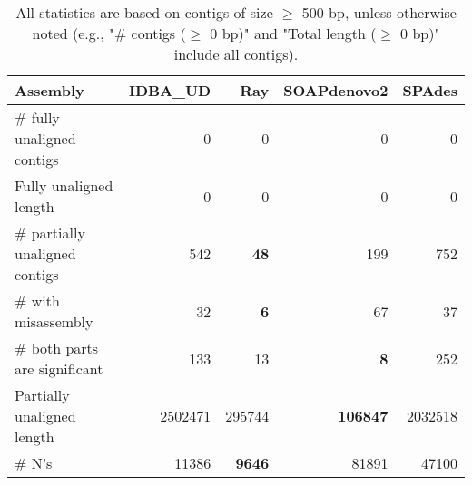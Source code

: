 \documentclass[12pt,a4paper]{article}
\begin{document}
\begin{table}[ht]
\begin{center}
\caption{All statistics are based on contigs of size $\geq$ 500 bp, unless otherwise noted (e.g., "\# contigs ($\geq$ 0 bp)" and "Total length ($\geq$ 0 bp)" include all contigs).}
\begin{tabular}{|l*{4}{|r}|}
\hline
Assembly & IDBA\_UD & Ray & SOAPdenovo2 & SPAdes \\ \hline
\# fully unaligned contigs & 0 & 0 & 0 & 0 \\ \hline
Fully unaligned length & 0 & 0 & 0 & 0 \\ \hline
\# partially unaligned contigs & 542 & {\bf 48} & 199 & 752 \\ \hline
\hspace{5mm}\# with misassembly & 32 & {\bf 6} & 67 & 37 \\ \hline
\hspace{5mm}\# both parts are significant & 133 & 13 & {\bf 8} & 252 \\ \hline
Partially unaligned length & 2502471 & 295744 & {\bf 106847} & 2032518 \\ \hline
\# N's & 11386 & {\bf 9646} & 81891 & 47100 \\ \hline
\end{tabular}
\end{center}
\end{table}
\end{document}

